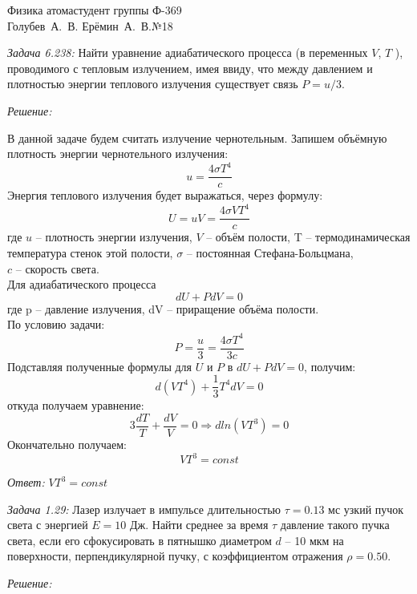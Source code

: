 






{Физика атома}{студент группы Ф-369\\Голубев~А.~В.}
{Ерёмин~А.~В.}{№1}{8}

\newpage

\emph{Задача 6.238: }
Найти уравнение адиабатического процесса (в переменных \( V \), \( T \) ), 
проводимого с тепловым излучением, имея ввиду, что между давлением и плотностью 
энергии теплового излучения существует связь \( P = u/3 \).

\emph{Решение:}

В данной задаче будем считать излучение чернотельным. Запишем объёмную
плотность энергии чернотельного излучения:
	\[ u = \frac{4\sigma T^4}{c} \]
Энергия теплового излучения будет выражаться, через формулу:
	\[ U = uV = \frac{4\sigma VT^4}{c} \]
где \( u \) -- плотность энергии излучения, \( V \) -- объём полости, 
T -- термодинамическая температура стенок этой полости, 
\( \sigma \) -- постоянная Стефана-Больцмана, \\ \( c \) -- скорость света. \\
Для адиабатического процесса
	\[ dU + PdV = 0 \]
где p -- давление излучения, dV -- приращение объёма полости. \\
По условию задачи:
	\[ P = \frac{u}{3} = \frac{4\sigma T^4}{3c} \]
Подставляя полученные формулы для \( U \) и \( P \) в \( dU + PdV = 0 \), получим:
	\[ d(VT^4) + \frac{1}{3}T^4 dV = 0 \]
откуда получаем уравнение:
	\[ 3\frac{dT}{T} + \frac{dV}{V} = 0 \Rightarrow dln(VT^3) = 0 \]
Окончательно получаем:
	\[ VT^3 = const \] 

\emph{Ответ:} \( VT^3 = const \)

\newpage


\emph{Задача 1.29: }
Лазер излучает в импульсе длительностью \( \tau = 0.13 \) мс узкий пучок света 
с энергией \( E = 10 \) Дж. Найти среднее за время \( \tau \) давление такого 
пучка света, если его сфокусировать в пятнышко диаметром \( d \) -- 10 мкм 
на поверхности, перпендикулярной пучку, с коэффициентом отражения \( \rho = 0.50 \).

\emph{Решение:}

